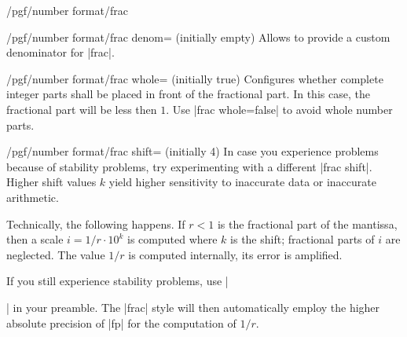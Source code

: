 \begin{key}{/pgf/number format/frac}
    \begin{key}{/pgf/number format/frac denom= (initially empty)}
        Allows to provide a custom denominator for |frac|.
\begin{codeexample}[width=3cm,preamble={\usetikzlibrary{fpu}},pre={\begin{lateximage}},post={\end{lateximage}}]
\hspace{1em}
\hspace{1em}
\hspace{1em}
\hspace{1em}
\hspace{1em}
\end{codeexample}
    \end{key}
    \begin{key}{/pgf/number format/frac whole= (initially true)}
        Configures whether complete integer parts shall be placed in front of
        the fractional part. In this case, the fractional part will be less
        then $1$. Use |frac whole=false| to avoid whole number parts.
\begin{codeexample}[width=3cm,preamble={\usetikzlibrary{fpu}},pre={\begin{lateximage}},post={\end{lateximage}}]
\hspace{1em}
\hspace{1em}
\hspace{1em}
\hspace{1em}
\hspace{1em}
\end{codeexample}
    \end{key}
    \begin{key}{/pgf/number format/frac shift= (initially 4)}
        In case you experience problems because of stability problems, try
        experimenting with a different |frac shift|. Higher shift values $k$
        yield higher sensitivity to inaccurate data or inaccurate arithmetic.

        Technically, the following happens. If $r < 1$ is the fractional part
        of the mantissa, then a scale $i = 1/r \cdot 10^k$ is computed where
        $k$ is the shift; fractional parts of $i$ are neglected. The value
        $1/r$ is computed internally, its error is amplified.

        If you still experience stability problems, use |\usepackage{fp}| in
        your preamble. The |frac| style will then automatically employ the
        higher absolute precision of |fp| for the computation of $1/r$.
    \end{key}
\end{key}

